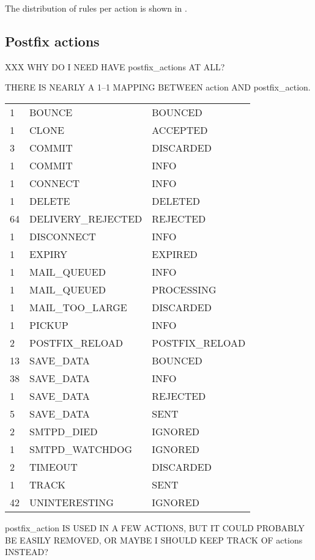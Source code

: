 The distribution of rules per action is shown in .


\subsection{Postfix actions}

\label{list of postfix actions}

XXX WHY DO I NEED HAVE postfix\_actions AT ALL\@?

THERE IS NEARLY A 1--1 MAPPING BETWEEN action AND postfix\_action.

\begin{tabular}{lll}

1 & BOUNCE & BOUNCED \\
1 & CLONE & ACCEPTED \\
3 & COMMIT & DISCARDED \\
1 & COMMIT & INFO \\
1 & CONNECT & INFO \\
1 & DELETE & DELETED \\
64 & DELIVERY\_REJECTED & REJECTED \\
1 & DISCONNECT & INFO \\
1 & EXPIRY & EXPIRED \\
1 & MAIL\_QUEUED & INFO \\
1 & MAIL\_QUEUED & PROCESSING \\
1 & MAIL\_TOO\_LARGE & DISCARDED \\
1 & PICKUP & INFO \\
2 & POSTFIX\_RELOAD & POSTFIX\_RELOAD \\
13 & SAVE\_DATA & BOUNCED \\
38 & SAVE\_DATA & INFO \\
1 & SAVE\_DATA & REJECTED \\
5 & SAVE\_DATA & SENT \\
2 & SMTPD\_DIED & IGNORED \\
1 & SMTPD\_WATCHDOG & IGNORED \\
2 & TIMEOUT & DISCARDED \\
1 & TRACK & SENT \\
42 & UNINTERESTING & IGNORED \\

\end{tabular}

postfix\_action IS USED IN A FEW ACTIONS, BUT IT COULD PROBABLY BE EASILY
REMOVED, OR MAYBE I SHOULD KEEP TRACK OF actions INSTEAD\@?

